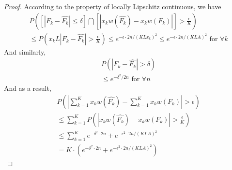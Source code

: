 \begin{proof}
According to the property of locally Lipschitz continuous,
we have
\begin{align*}
& P ( [ \left| F_k - \hat{F_k} \right| \leq\delta ] \bigcap [ \left| x_k w(\hat{F_k}) -x_k w(F_k)
\right| ] > \frac {\epsilon} {K}) \\ & \leq P(x_k L \left| F_k - \hat{F_k} \right| > \frac
    {\epsilon} {K}) \leq e^ {-\epsilon\cdot 2n /(K L x_k)^2} \leq e^ {-\epsilon\cdot 2n /(K L A)^2}
    \text{     for    } \forall k
\end{align*}
And similarly,
\begin{align*}
& P(\left| F_k - \hat{F_k} \right| > \delta) \\ & \leq e^{-\delta^2 /2n} \text{    for     } \forall
    n
\end{align*}
And as a result,
\begin{align*}
& P(\left| \sum_{k=1}^K x_k w(\hat{F_k}) - \sum_{k=1}^K x_k w(F_k) \right| >\epsilon) \\ & \leq
\sum_{k=1}^K P (\left| x_k w(\hat{F_k}) -x_k w(F_k) \right| > \frac {\epsilon} {K}) \\ & \leq
             \sum_{k=1}^K e^{-\delta^2\cdot 2n} + e^{-\epsilon^2 \cdot 2n/ (KLA)^2} \\ & =K\cdot
    (e^{-\delta^2\cdot 2n} + e^{-\epsilon^2 \cdot 2n/ (KLA)^2})
\end{align*}

\end{proof}

